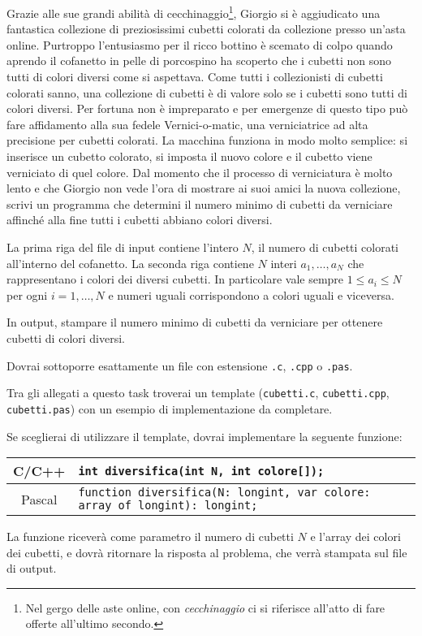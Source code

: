 \usepackage{xcolor}
\usepackage{afterpage}

Grazie alle sue grandi abilità di cecchinaggio\footnote{Nel gergo delle aste online, con \emph{cecchinaggio} ci si riferisce all'atto di fare offerte all'ultimo secondo.}, Giorgio si è aggiudicato una fantastica collezione di preziosissimi cubetti colorati da collezione presso un'asta online. Purtroppo l'entusiasmo per il ricco bottino è scemato di colpo quando aprendo il cofanetto in pelle di porcospino ha scoperto che i cubetti non sono tutti di colori diversi come si aspettava. Come tutti i collezionisti di cubetti colorati sanno, una collezione di cubetti è di valore solo se i cubetti sono tutti di colori diversi. Per fortuna non è impreparato e per emergenze di questo tipo può fare affidamento alla sua fedele Vernici-o-matic\texttrademark, una verniciatrice ad alta precisione per cubetti colorati. La macchina funziona in modo molto semplice: si inserisce un cubetto colorato, si imposta il nuovo colore e il cubetto viene verniciato di quel colore. Dal momento che il processo di verniciatura è molto lento e che Giorgio non vede l'ora di mostrare ai suoi amici la nuova collezione, scrivi un programma che determini il numero minimo di cubetti da verniciare affinché alla fine tutti i cubetti abbiano colori diversi.

\InputFile
La prima riga del file di input contiene l'intero $N$, il numero di cubetti colorati all'interno del cofanetto. La seconda riga contiene $N$ interi $a_1, \ldots, a_N$ che rappresentano i colori dei diversi cubetti. In particolare vale sempre $1 \le a_i \le N$ per ogni $i=1,\ldots,N$ e numeri uguali corrispondono a colori uguali e viceversa.

\OutputFile
In output, stampare il numero minimo di cubetti da verniciare per ottenere cubetti di colori diversi.

\Implementation
Dovrai sottoporre esattamente un file con estensione \texttt{.c}, \texttt{.cpp} o \texttt{.pas}.

\begin{warning}
Tra gli allegati a questo task troverai un template (\texttt{cubetti.c}, \texttt{cubetti.cpp}, \texttt{cubetti.pas}) con un esempio di implementazione da completare.
\end{warning}

Se sceglierai di utilizzare il template, dovrai implementare la seguente funzione:
\begin{center}\begin{tabularx}{\textwidth}{|c|X|}
\hline
C/C++  & \verb|int diversifica(int N, int colore[]);|\\
\hline
Pascal & \small\verb|function diversifica(N: longint, var colore: array of longint): longint;|\\
\hline
\end{tabularx}\end{center}
La funzione riceverà come parametro il numero di cubetti $N$ e l'array dei colori dei cubetti, e dovrà ritornare la risposta al problema, che verrà stampata sul file di output.

